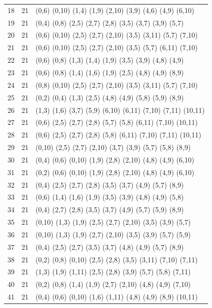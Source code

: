 {\begin{longtable}{lll}
18  & 21 & (0,6) (0,10) (1,4) (1,9) (2,10) (3,9) (4,6) (4,9) (6,10) \\
19  & 21 & (0,4) (0,8) (2,5) (2,7) (2,8) (3,5) (3,7) (3,9) (5,7) \\
20  & 21 & (0,6) (0,10) (2,5) (2,7) (2,10) (3,5) (3,11) (5,7) (7,10) \\
21  & 21 & (0,6) (0,10) (2,5) (2,7) (2,10) (3,5) (5,7) (6,11) (7,10) \\
22  & 21 & (0,6) (0,8) (1,3) (1,4) (1,9) (3,5) (3,9) (4,8) (4,9) \\
23  & 21 & (0,6) (0,8) (1,4) (1,6) (1,9) (2,5) (4,8) (4,9) (8,9) \\
24  & 21 & (0,8) (0,10) (2,5) (2,7) (2,10) (3,5) (3,11) (5,7) (7,10) \\
25  & 21 & (0,2) (0,4) (1,3) (2,5) (4,8) (4,9) (5,8) (5,9) (8,9) \\
26  & 21 & (1,3) (1,6) (3,7) (5,9) (6,10) (6,11) (7,10) (7,11) (10,11) \\
27  & 21 & (0,6) (2,5) (2,7) (2,8) (5,7) (5,8) (6,11) (7,10) (10,11) \\
28  & 21 & (0,6) (2,5) (2,7) (2,8) (5,8) (6,11) (7,10) (7,11) (10,11) \\
29  & 21 & (0,10) (2,5) (2,7) (2,10) (3,7) (3,9) (5,7) (5,8) (8,9) \\
30  & 21 & (0,4) (0,6) (0,10) (1,9) (2,8) (2,10) (4,8) (4,9) (6,10) \\
31  & 21 & (0,2) (0,6) (0,10) (1,9) (2,8) (2,10) (4,8) (4,9) (6,10) \\
32  & 21 & (0,4) (2,5) (2,7) (2,8) (3,5) (3,7) (4,9) (5,7) (8,9) \\
33  & 21 & (0,6) (1,4) (1,6) (1,9) (3,5) (3,9) (4,8) (4,9) (5,8) \\
34  & 21 & (0,4) (2,7) (2,8) (3,5) (3,7) (4,9) (5,7) (5,9) (8,9) \\
35  & 21 & (0,10) (1,3) (1,9) (2,5) (2,7) (2,10) (3,5) (3,9) (5,7) \\
36  & 21 & (0,10) (1,3) (1,9) (2,7) (2,10) (3,5) (3,9) (5,7) (5,9) \\
37  & 21 & (0,4) (2,5) (2,7) (3,5) (3,7) (4,8) (4,9) (5,7) (8,9) \\
38  & 21 & (0,2) (0,8) (0,10) (2,5) (2,8) (3,5) (3,11) (7,10) (7,11) \\
39  & 21 & (1,3) (1,9) (1,11) (2,5) (2,8) (3,9) (5,7) (5,8) (7,11) \\
40  & 21 & (0,2) (0,8) (1,4) (1,9) (2,7) (2,10) (4,8) (4,9) (7,10) \\
41  & 21 & (0,4) (0,6) (0,10) (1,6) (1,11) (4,8) (4,9) (8,9) (10,11) \\

\end{longtable}}
